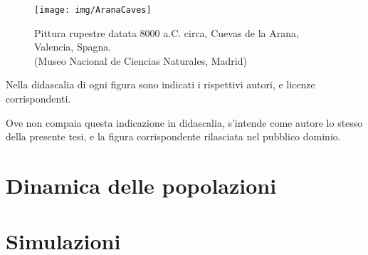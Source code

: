 \documentclass[12pt,a4paper,oneside,hidelinks]{book} %
\begin{document}


\frontmatter


\pagebreak



\begin{figure}[hbp]
    \centering
    \texttt{[image: img/AranaCaves]}

    \caption[Pittura rupestre di Arana.]{Pittura rupestre datata 8000 a.C. circa, Cuevas de la Arana, Valencia, Spagna. \\ (Museo Nacional de Ciencias Naturales, Madrid)}
    \label{img:arana}
\end{figure}

\cleardoublepage
\tableofcontents

\listoffigures
Nella didascalia di ogni figura sono indicati i rispettivi autori, e licenze corrispondenti.

Ove non compaia questa indicazione in didascalia, s'intende come autore lo stesso della presente tesi, e la figura
corrispondente rilasciata nel pubblico dominio.

\listoftables


\mainmatter

\clearpage
\part{Dinamica delle popolazioni}




\part{Simulazioni}





\appendix



\backmatter



\cleardoublepage
{}
\nocite{*} %
\printbibliography
\end{document}
